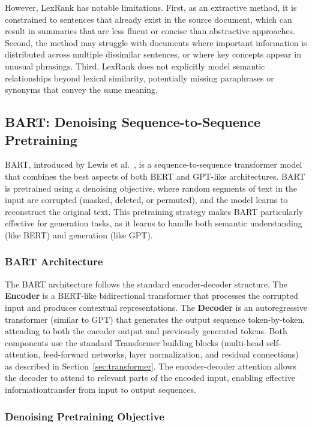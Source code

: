 However, LexRank has notable limitations. First, as an extractive method, it is constrained to sentences that already exist in the source document, which can result in summaries that are less fluent or concise than abstractive approaches. Second, the method may struggle with documents where important information is distributed across multiple dissimilar sentences, or where key concepts appear in unusual phrasings. Third, LexRank does not explicitly model semantic relationships beyond lexical similarity, potentially missing paraphrases or synonyms that convey the same meaning.

\subsection{BART: Denoising Sequence-to-Sequence Pretraining}

\gls{BART}, introduced by Lewis et al.~\cite{lewis2019bart}, is a sequence-to-sequence transformer model that combines the best aspects of both \gls{BERT} and \gls{GPT}-like architectures. \gls{BART} is pretrained using a denoising objective, where random segments of text in the input are corrupted (masked, deleted, or permuted), and the model learns to reconstruct the original text. This pretraining strategy makes \gls{BART} particularly effective for generation tasks, as it learns to handle both semantic understanding (like \gls{BERT}) and generation (like \gls{GPT}).

\subsubsection{BART Architecture}

The \gls{BART} architecture follows the standard encoder-decoder structure. The \textbf{Encoder} is a \gls{BERT}-like bidirectional transformer that processes the corrupted input and produces contextual representations. The \textbf{Decoder} is an autoregressive transformer (similar to \gls{GPT}) that generates the output sequence token-by-token, attending to both the encoder output and previously generated tokens. Both components use the standard Transformer building blocks (multi-head self-attention, feed-forward networks, layer normalization, and residual connections) as described in Section~\ref{sec:transformer}. The encoder-decoder attention allows the decoder to attend to relevant parts of the encoded input, enabling effective informationtransfer from input to output sequences.

\subsubsection{Denoising Pretraining Objective}

